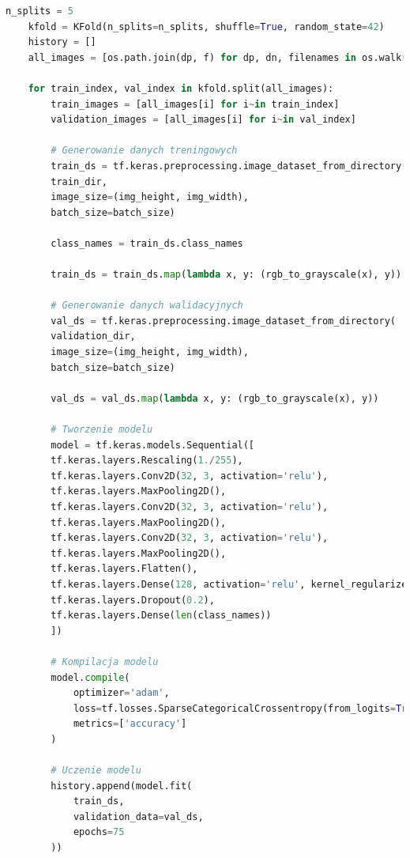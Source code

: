 \begin{lstlisting}[language=Python,caption=Listing skryptu tworzącego model z~walidacją krzyżową
	oraz uczonym na~wszystkich wariantach liczby wierzchołków grafów,label={tests-model-1}]
	n_splits = 5
	kfold = KFold(n_splits=n_splits, shuffle=True, random_state=42)
	history = []
	all_images = [os.path.join(dp, f) for dp, dn, filenames in os.walk(data_dir_model) for f in filenames if os.path.splitext(f)[1] == '.png']
  
	for train_index, val_index in kfold.split(all_images):
		train_images = [all_images[i] for i~in train_index]
		validation_images = [all_images[i] for i~in val_index]

		# Generowanie danych treningowych
		train_ds = tf.keras.preprocessing.image_dataset_from_directory(
		train_dir,
		image_size=(img_height, img_width),
		batch_size=batch_size)

		class_names = train_ds.class_names

		train_ds = train_ds.map(lambda x, y: (rgb_to_grayscale(x), y))

		# Generowanie danych walidacyjnych
		val_ds = tf.keras.preprocessing.image_dataset_from_directory(
		validation_dir,
		image_size=(img_height, img_width),
		batch_size=batch_size)

		val_ds = val_ds.map(lambda x, y: (rgb_to_grayscale(x), y))

		# Tworzenie modelu
		model = tf.keras.models.Sequential([
		tf.keras.layers.Rescaling(1./255),
		tf.keras.layers.Conv2D(32, 3, activation='relu'),
		tf.keras.layers.MaxPooling2D(),
		tf.keras.layers.Conv2D(32, 3, activation='relu'),
		tf.keras.layers.MaxPooling2D(),
		tf.keras.layers.Conv2D(32, 3, activation='relu'),
		tf.keras.layers.MaxPooling2D(),
		tf.keras.layers.Flatten(),
		tf.keras.layers.Dense(128, activation='relu', kernel_regularizer=tf.keras.regularizers.l2(0.01)),
		tf.keras.layers.Dropout(0.2),
		tf.keras.layers.Dense(len(class_names))
		])
		
		# Kompilacja modelu
		model.compile(
			optimizer='adam',
			loss=tf.losses.SparseCategoricalCrossentropy(from_logits=True),
			metrics=['accuracy']
		)

		# Uczenie modelu
		history.append(model.fit(
			train_ds,
			validation_data=val_ds,
			epochs=75
		))
\end{lstlisting}


